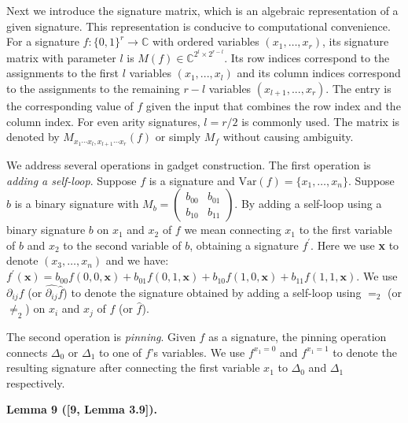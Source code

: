 Next we introduce the signature matrix, which is an algebraic representation of a given signature. This representation is conducive to computational convenience.
For a signature $f:\{0,1\}^{r}\to\mathbb{C}$ with ordered variables $(x_{1},\ldots,x_{r})$, its signature matrix with parameter $l$ is $M(f)\in\mathbb{C}^{2^{l}\times 2^{r-l}}$. Its row indices correspond to the assignments to the first $l$ variables $(x_{1},...,x_{l})$ and its column indices correspond to the assignments to the remaining $r-l$ variables $(x_{l+1},...,x_{r})$. The entry is the corresponding value of $f$ given the input that combines the row index and the column index. For even arity signatures, $l=r/2$ is commonly used. The matrix is denoted by $M_{x_{1}\cdots x_{l},x_{l+1}\cdots x_{r}}(f)$ or simply $M_{f}$ without causing ambiguity.\par




We address several operations in gadget construction. The first operation is \emph{adding a self-loop}. Suppose $f$ is a signature and $\text{Var}(f)=\{x_{1},\ldots,x_{n}\}$. Suppose $b$ is a binary signature with $M_{b}=\begin{pmatrix}b_{00}&b_{01}\\
b_{10}&b_{11}\end{pmatrix}$. By adding a self-loop using a binary signature $b$ on $x_{1}$ and $x_{2}$ of $f$ we mean connecting $x_{1}$ to the first variable of $b$ and $x_{2}$ to the second variable of $b$, obtaining a signature $f^{\prime}$. Here we use \textbf{x} to denote $(x_{3},\ldots,x_{n})$ and we have: $f^{\prime}(\textbf{x})=b_{00}f(0,0,\textbf{x})+b_{01}f(0,1,\textbf{x})+b_{10}f(1,0,\textbf{x})+b_{11}f(1,1,\textbf{x}).$ We use $\partial_{ij}f$ (or $\widehat{\partial_{ij}}\widehat{f}$) to denote the signature obtained by adding a self-loop using $=_{2}$ (or $\neq_{2}$) on $x_{i}$ and $x_{j}$ of $f$ (or $\widehat{f}$).\par




The second operation is \emph{pinning}. Given $f$ as a signature, the pinning operation connects $\Delta_{0}$ or $\Delta_{1}$ to one of $f$’s variables. We use $f^{x_{1}=0}$ and $f^{x_{1}=1}$ to denote the resulting signature after connecting the first variable $x_{1}$ to $\Delta_{0}$ and $\Delta_{1}$ respectively.\par





\par\medskip\noindent\textbf{
\textbf{Lemma 9}\textbf{ }([9, Lemma 3.9])\textbf{.}
}\par




